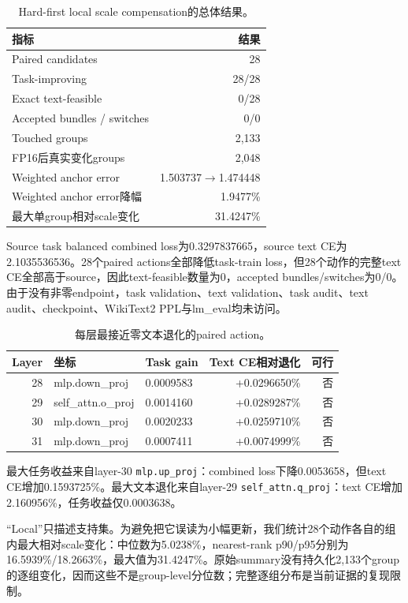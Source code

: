 \begin{table}[t]
\centering
\small
\caption{Hard-first local scale compensation的总体结果。}
\begin{tabular}{lr}
\toprule
指标 & 结果\\
\midrule
Paired candidates & 28\\
Task-improving & 28/28\\
Exact text-feasible & 0/28\\
Accepted bundles / switches & 0/0\\
Touched groups & 2,133\\
FP16后真实变化groups & 2,048\\
Weighted anchor error & 1.503737$\rightarrow$1.474448\\
Weighted anchor error降幅 & 1.9477\%\\
最大单group相对scale变化 & 31.4247\%\\
\bottomrule
\end{tabular}
\end{table}

Source task balanced combined loss为0.3297837665，source text CE为2.1035536536。28个paired actions全部降低task-train loss，但28个动作的完整text CE全部高于source，因此text-feasible数量为0，accepted bundles/switches为0/0。由于没有非零endpoint，task validation、text validation、task audit、text audit、checkpoint、WikiText2 PPL与lm\_eval均未访问。

\begin{table}[t]
\centering
\small
\caption{每层最接近零文本退化的paired action。}
\begin{tabular}{rllrr}
\toprule
Layer & 坐标 & Task gain & Text CE相对退化 & 可行\\
\midrule
28 & mlp.down\_proj & 0.0009583 & +0.0296650\% & 否\\
29 & self\_attn.o\_proj & 0.0014160 & +0.0289287\% & 否\\
30 & mlp.down\_proj & 0.0020233 & +0.0259710\% & 否\\
31 & mlp.down\_proj & 0.0007411 & +0.0074999\% & 否\\
\bottomrule
\end{tabular}
\end{table}

最大任务收益来自layer-30 \texttt{mlp.up\_proj}：combined loss下降0.0053658，但text CE增加0.1593725\%。最大文本退化来自layer-29 \texttt{self\_attn.q\_proj}：text CE增加2.160956\%，任务收益仅0.0003638。

``Local''只描述支持集。为避免把它误读为小幅更新，我们统计28个动作各自的组内最大相对scale变化：中位数为5.0238\%，nearest-rank p90/p95分别为16.5939\%/18.2663\%，最大值为31.4247\%。原始summary没有持久化2,133个group的逐组变化，因而这些不是group-level分位数；完整逐组分布是当前证据的复现限制。

